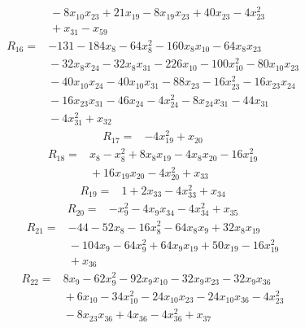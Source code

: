 {\begin{align*}
&{}  - 8x_{10} x_{23} + 21x_{19} - 8x_{19} x_{23} + 40x_{23} - 4x_{23}^{2} \\
&{}  + x_{31} - x_{59}
\end{align*}
\begin{align*}
R_{16} ={}& -131 - 184x_{8} - 64x_{8}^{2} - 160x_{8} x_{10} - 64x_{8} x_{23} \\
&{}  - 32x_{8} x_{24} - 32x_{8} x_{31} - 226x_{10} - 100x_{10}^{2} - 80x_{10} x_{23} \\
&{}  - 40x_{10} x_{24} - 40x_{10} x_{31} - 88x_{23} - 16x_{23}^{2} - 16x_{23} x_{24} \\
&{}  - 16x_{23} x_{31} - 46x_{24} - 4x_{24}^{2} - 8x_{24} x_{31} - 44x_{31} \\
&{}  - 4x_{31}^{2} + x_{32}
\end{align*}
\begin{align*}
R_{17} ={}& -4x_{19}^{2} + x_{20}
\end{align*}
\begin{align*}
R_{18} ={}& x_{8} - x_{8}^{2} + 8x_{8} x_{19} - 4x_{8} x_{20} - 16x_{19}^{2} \\
&{}  + 16x_{19} x_{20} - 4x_{20}^{2} + x_{33}
\end{align*}
\begin{align*}
R_{19} ={}& 1 + 2x_{33} - 4x_{33}^{2} + x_{34}
\end{align*}
\begin{align*}
R_{20} ={}& -x_{9}^{2} - 4x_{9} x_{34} - 4x_{34}^{2} + x_{35}
\end{align*}
\begin{align*}
R_{21} ={}& -44 - 52x_{8} - 16x_{8}^{2} - 64x_{8} x_{9} + 32x_{8} x_{19} \\
&{}  - 104x_{9} - 64x_{9}^{2} + 64x_{9} x_{19} + 50x_{19} - 16x_{19}^{2} \\
&{}  + x_{36}
\end{align*}
\begin{align*}
R_{22} ={}& 8x_{9} - 62x_{9}^{2} - 92x_{9} x_{10} - 32x_{9} x_{23} - 32x_{9} x_{36} \\
&{}  + 6x_{10} - 34x_{10}^{2} - 24x_{10} x_{23} - 24x_{10} x_{36} - 4x_{23}^{2} \\
&{}  - 8x_{23} x_{36} + 4x_{36} - 4x_{36}^{2} + x_{37}
\end{align*}
}
